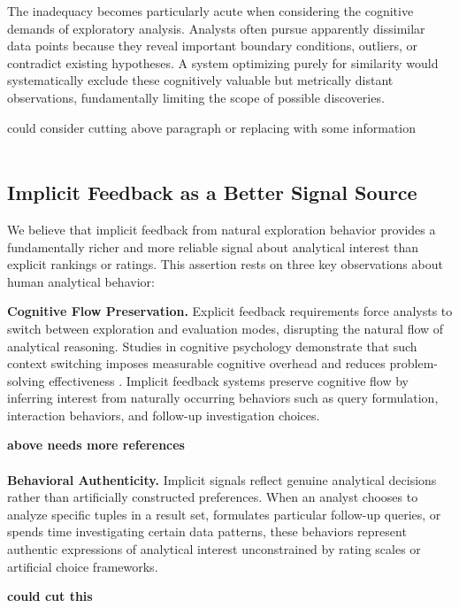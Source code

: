 \documentclass[sigconf, nonacm]{acmart}
\begin{document}
The inadequacy becomes particularly acute when considering the cognitive demands of exploratory analysis. Analysts often pursue apparently dissimilar data points because they reveal important boundary conditions, outliers, or contradict existing hypotheses. A system optimizing purely for similarity would systematically exclude these cognitively valuable but metrically distant observations, fundamentally limiting the scope of possible discoveries.

could consider cutting above paragraph or replacing with some information \\\\

\subsection{Implicit Feedback as a Better Signal Source}

We believe that implicit feedback from natural exploration behavior provides a fundamentally richer and more reliable signal about analytical interest than explicit rankings or ratings. This assertion rests on three key observations about human analytical behavior:

\textbf{Cognitive Flow Preservation.} Explicit feedback requirements force analysts to switch between exploration and evaluation modes, disrupting the natural flow of analytical reasoning. Studies in cognitive psychology demonstrate that such context switching imposes measurable cognitive overhead and reduces problem-solving effectiveness \cite{monsell2003task}. Implicit feedback systems preserve cognitive flow by inferring interest from naturally occurring behaviors such as query formulation, interaction behaviors, and follow-up investigation choices.

\textbf{above needs more references} \\ \\

\textbf{Behavioral Authenticity.} Implicit signals reflect genuine analytical decisions rather than artificially constructed preferences. When an analyst chooses to analyze specific tuples in a result set, formulates particular follow-up queries, or spends time investigating certain data patterns, these behaviors represent authentic expressions of analytical interest unconstrained by rating scales or artificial choice frameworks.

\textbf{ could cut this } \\\\
\end{document}
